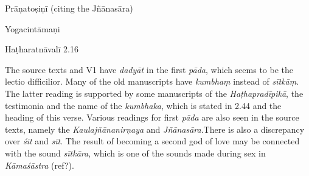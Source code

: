 \begin{ekdosis}
\begin{sources}[hp02_054]
\begin{versinnote}
\end{versinnote}

Prāṇatoṣiṇī (citing the Jñānasāra)

\begin{versinnote}
\end{versinnote}
\end{sources}

\begin{testimonia}[hp02_054]
Yogacintāmaṇi

\begin{versinnote}
\end{versinnote}

Haṭharatnāvalī 2.16

\begin{versinnote}
\end{versinnote}
\end{testimonia}

\begin{philcomm}[hp02_054]
The source texts and V1 have \emph{dadyāt} in the first \emph{pāda}, which seems to be the lectio difficilior. Many of the old manuscripts have \emph{kumbhaṃ} instead of \emph{sītkāṃ}. The latter reading is supported by some manuscripts of the \emph{Haṭhapradīpikā}, the testimonia and the name of the \emph{kumbhaka}, which is stated in 2.44 and the heading of this verse. Various readings for first \emph{pāda} are also seen in the source texts, namely the \emph{Kaulajñānanirṇaya} and \emph{Jñānasāra}.There is also a discrepancy over \emph{śīt} and \emph{sīt}. The result of becoming a second god of love may be connected with the sound \emph{sītkāra}, which is one of the sounds made during sex in \emph{Kāmaśāstra} (ref?).


\end{philcomm}
\end{ekdosis}
